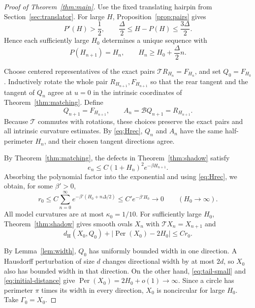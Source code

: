 \documentclass[11pt]{article}
\numberwithin{equation}{section}
\newcommand{\Tmap}{\mathcal T}
\newcommand{\Bmap}{\mathcal B}
\newcommand{\abs}[1]{\lvert #1\rvert}
\DeclareMathOperator{\Per}{Per}
\begin{document}
\begin{proof}[Proof of Theorem~\ref{thm:main}]
Use the fixed translating hairpin from Section~\ref{sec:translator}. For
large \(H\), Proposition~\ref{prop:pairs} gives
\[
  P'(H)>\frac12,\qquad
  \frac\Delta2\leq H-P(H)\leq\frac{3\Delta}2.
\]
Hence each sufficiently large \(H_0\) determines a unique sequence with
\begin{equation}\label{eq:Hrec}
  P(H_{n+1})=H_n,\qquad H_n\geq H_0+\frac\Delta2n.
\end{equation}

Choose centered representatives of the exact pairs
\(\Tmap R_{H_n}=F_{H_n}\), and set \(Q_0=F_{H_0}\).
Inductively rotate the whole pair \(R_{H_{n+1}},F_{H_{n+1}}\) so that the
rear tangent and the tangent of \(Q_n\) agree at \(u=0\) in the intrinsic
coordinates of Theorem~\ref{thm:matching}. Define
\[
  Q_{n+1}=F_{H_{n+1}},\qquad A_n=\Bmap Q_{n+1}=R_{H_{n+1}}.
\]
Because \(\Tmap\) commutes with rotations, these choices preserve the
exact pairs and all intrinsic curvature estimates. By \eqref{eq:Hrec},
\(Q_n\) and \(A_n\) have the same half-perimeter \(H_n\), and their chosen
tangent directions agree.

By Theorem~\ref{thm:matching}, the defects in
Theorem~\ref{thm:shadow} satisfy
\[
  e_n\leq C(1+H_n)^2e^{-\beta H_{n+1}}.
\]
Absorbing the polynomial factor into the exponential and using
\eqref{eq:Hrec}, we obtain, for some \(\beta'>0\),
\begin{equation}\label{eq:tail-small}
  r_0\leq C\sum_{n=0}^\infty e^{-\beta'(H_0+n\Delta/2)}
      \leq C'e^{-\beta'H_0}\longrightarrow0
      \qquad(H_0\to\infty).
\end{equation}
All model curvatures are at most \(\kappa_0=1/10\). For sufficiently large
\(H_0\), Theorem~\ref{thm:shadow} gives smooth ovals \(X_n\) with
\(\Tmap X_n=X_{n+1}\) and
\begin{equation}\label{eq:initial-distance}
  d_{\mathrm H}(X_0,Q_0)+\abs{\Per(X_0)-2H_0}\leq Cr_0.
\end{equation}

By Lemma~\ref{lem:width}, \(Q_0\) has uniformly bounded width in one
direction. A Hausdorff perturbation of size \(d\) changes directional width
by at most \(2d\), so \(X_0\) also has bounded width in that direction. On
the other hand, \eqref{eq:tail-small} and \eqref{eq:initial-distance} give
\(\Per(X_0)=2H_0+o(1)\to\infty\). Since a circle has perimeter \(\pi\)
times its width in every direction, \(X_0\) is noncircular for large
\(H_0\). Take \(\Gamma_0=X_0\).
\end{proof}
\end{document}
